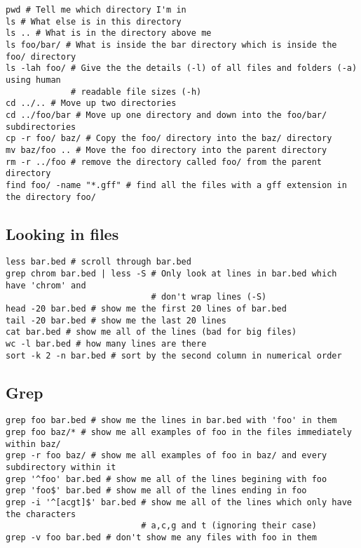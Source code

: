 \documentclass[11pt]{article}
\begin{document}
\begin{verbatim}
pwd # Tell me which directory I'm in
ls # What else is in this directory
ls .. # What is in the directory above me
ls foo/bar/ # What is inside the bar directory which is inside the foo/ directory
ls -lah foo/ # Give the the details (-l) of all files and folders (-a) using human
             # readable file sizes (-h)
cd ../.. # Move up two directories
cd ../foo/bar # Move up one directory and down into the foo/bar/ subdirectories
cp -r foo/ baz/ # Copy the foo/ directory into the baz/ directory
mv baz/foo .. # Move the foo directory into the parent directory
rm -r ../foo # remove the directory called foo/ from the parent directory
find foo/ -name "*.gff" # find all the files with a gff extension in the directory foo/
\end{verbatim}

\hypertarget{looking-in-files}{%
\subsection{Looking in files}\label{looking-in-files}}

\begin{verbatim}
less bar.bed # scroll through bar.bed
grep chrom bar.bed | less -S # Only look at lines in bar.bed which have 'chrom' and
                             # don't wrap lines (-S)
head -20 bar.bed # show me the first 20 lines of bar.bed
tail -20 bar.bed # show me the last 20 lines
cat bar.bed # show me all of the lines (bad for big files)
wc -l bar.bed # how many lines are there
sort -k 2 -n bar.bed # sort by the second column in numerical order
\end{verbatim}

\hypertarget{grep}{%
\subsection{Grep}\label{grep}}

\begin{verbatim}
grep foo bar.bed # show me the lines in bar.bed with 'foo' in them
grep foo baz/* # show me all examples of foo in the files immediately within baz/
grep -r foo baz/ # show me all examples of foo in baz/ and every subdirectory within it
grep '^foo' bar.bed # show me all of the lines begining with foo
grep 'foo$' bar.bed # show me all of the lines ending in foo
grep -i '^[acgt]$' bar.bed # show me all of the lines which only have the characters
                           # a,c,g and t (ignoring their case)
grep -v foo bar.bed # don't show me any files with foo in them
\end{verbatim}
\end{document}
